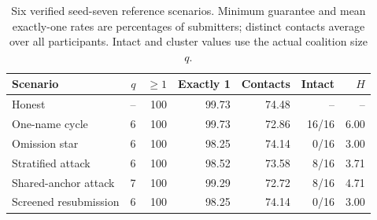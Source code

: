 \begin{table}[tb]\centering\small
\caption{Six verified seed-seven reference scenarios. Minimum guarantee and mean exactly-one rates are percentages of submitters; distinct contacts average over all participants. Intact and cluster values use the actual coalition size $q$.}\label{tab:summary}
\begin{tabular}{@{}lrrrrrr@{}}\toprule
Scenario & $q$ & $\ge1$ & Exactly 1 & Contacts & Intact & $H$ \\ \midrule
Honest & -- & 100 & 99.73 & 74.48 & -- & -- \\
One-name cycle & 6 & 100 & 99.73 & 72.86 & 16/16 & 6.00 \\
Omission star & 6 & 100 & 98.25 & 74.14 & 0/16 & 3.00 \\
Stratified attack & 6 & 100 & 98.52 & 73.58 & 8/16 & 3.71 \\
Shared-anchor attack & 7 & 100 & 99.29 & 72.72 & 8/16 & 4.71 \\
Screened resubmission & 6 & 100 & 98.25 & 74.14 & 0/16 & 3.00 \\
\bottomrule\end{tabular}\end{table}
